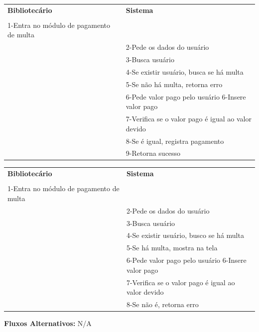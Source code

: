 \documentclass[
	12pt,				%
	openright,			%
	oneside,			%
	a4paper,			%
	english,			%
	brazil				%
	]{abntex2}
\begin{document}
\begin{table}[H]
\ABNTEXfontereduzida
\begin{center}
\begin{tabular}{p{5.5cm} p{5.5cm}}
    \textbf{Bibliotecário} & \textbf{Sistema}\\
     & \\
    1-Entra no módulo de pagamento de multa & \\
     & 2-Pede os dados do usuário\\
     & 3-Busca usuário \\
     & 4-Se existir usuário, busca se há multa\\
     & 5-Se não há multa, retorna erro\\
     & 6-Pede valor pago pelo usuário
    6-Insere valor pago\\
     & 7-Verifica se o valor pago é igual ao valor devido \\
     & 8-Se é igual, registra pagamento\\
     & 9-Retorna sucesso\\
\end{tabular}
\end{center}
\end{table} 

\begin{table}[H]
\ABNTEXfontereduzida
\begin{center}
\begin{tabular}{p{5.5cm} p{5.5cm}}
    \textbf{Bibliotecário} & \textbf{Sistema}\\
     & \\
    1-Entra no módulo de pagamento de multa & \\
     & 2-Pede os dados do usuário\\
     & 3-Busca usuário \\
     & 4-Se existir usuário, busco se há multa\\
     & 5-Se há multa, mostra na tela\\
     & 6-Pede valor pago pelo usuário
    6-Insere valor pago\\
     & 7-Verifica se o valor pago é igual ao valor devido \\
     & 8-Se não é, retorna erro\\
\end{tabular}
\end{center}
\end{table} 
                                                                
\textbf{Fluxos Alternativos:} N/A
\end{document}
